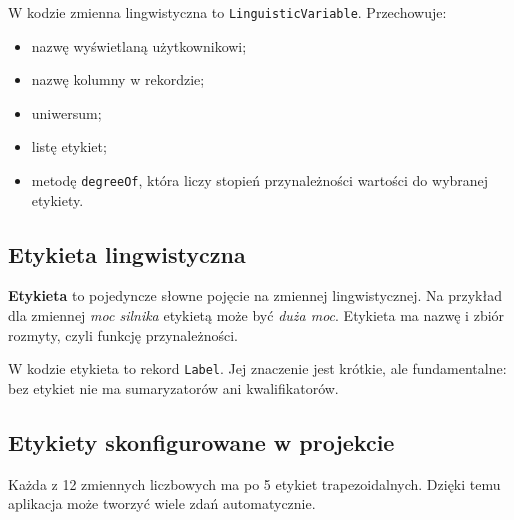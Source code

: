 \documentclass[11pt,a4paper]{article}
\newcommand{\code}[1]{\texttt{#1}}
\newcommand{\term}[1]{\textbf{#1}}
\begin{document}
W kodzie zmienna lingwistyczna to \code{LinguisticVariable}. Przechowuje:

\begin{itemize}
    \item nazwę wyświetlaną użytkownikowi;
    \item nazwę kolumny w rekordzie;
    \item uniwersum;
    \item listę etykiet;
    \item metodę \code{degreeOf}, która liczy stopień przynależności wartości do wybranej etykiety.
\end{itemize}

\subsection{Etykieta lingwistyczna}

\term{Etykieta} to pojedyncze słowne pojęcie na zmiennej lingwistycznej. Na przykład dla zmiennej \emph{moc silnika} etykietą może być \emph{duża moc}. Etykieta ma nazwę i zbiór rozmyty, czyli funkcję przynależności.

W kodzie etykieta to rekord \code{Label}. Jej znaczenie jest krótkie, ale fundamentalne: bez etykiet nie ma sumaryzatorów ani kwalifikatorów.

\subsection{Etykiety skonfigurowane w projekcie}

Każda z 12 zmiennych liczbowych ma po 5 etykiet trapezoidalnych. Dzięki temu aplikacja może tworzyć wiele zdań automatycznie.
\end{document}
